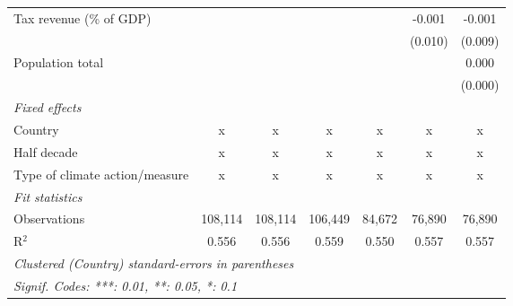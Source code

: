 \begin{tabular}{lcccccc}
   Tax revenue (\% of GDP)              &              &               &               &                & -0.001         & -0.001\\   
                                        &              &               &               &                & (0.010)        & (0.009)\\   
   Population total                     &              &               &               &                &                & 0.000\\   
                                        &              &               &               &                &                & (0.000)\\   
   \emph{Fixed effects}\\
   Country                              & x            & x             & x             & x              & x              & x\\  
   Half decade                          & x            & x             & x             & x              & x              & x\\  
   Type of climate action/measure       & x            & x             & x             & x              & x              & x\\  
   \midrule \emph{Fit statistics}\\
   Observations                         & 108,114      & 108,114       & 106,449       & 84,672         & 76,890         & 76,890\\  
   R$^2$                                & 0.556        & 0.556         & 0.559         & 0.550          & 0.557          & 0.557\\  
   \midrule
   \multicolumn{7}{l}{\emph{Clustered (Country) standard-errors in parentheses}}\\
   \multicolumn{7}{l}{\emph{Signif. Codes: ***: 0.01, **: 0.05, *: 0.1}}\\
\end{tabular}
\par\endgroup


